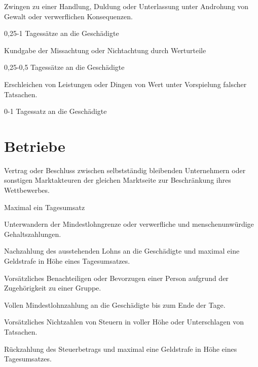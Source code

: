 \documentclass{sasbase}
\begin{document}
\begin{lawparagraph}[Nötigung]
    \item Zwingen zu einer Handlung, Duldung oder Unterlassung unter Androhung von Gewalt oder
        verwerflichen Konsequenzen.
    \item 0,25-1 Tagessätze an die Geschädigte
\end{lawparagraph}

\begin{lawparagraph}[Beleidigung]
    \item Kundgabe der Missachtung oder Nichtachtung durch Werturteile
    \item 0,25-0,5 Tagessätze an die Geschädigte
\end{lawparagraph}

\begin{lawparagraph}
    \item Erschleichen von Leistungen oder Dingen von Wert unter Vorspielung falscher Tatsachen.
    \item 0-1 Tagessatz an die Geschädigte
\end{lawparagraph}

\section{Betriebe}

\begin{lawparagraph}[Kartellbildung]
    \item Vertrag oder Beschluss zwischen selbstständig bleibenden Unternehmern oder sonstigen
        Marktakteuren der gleichen Marktseite zur Beschränkung ihres Wettbewerbes.
    \item Maximal ein Tagesumsatz
\end{lawparagraph}

\begin{lawparagraph}[Lohndumping]
    \item Unterwandern der Mindestlohngrenze oder verwerfliche und menschenunwürdige
        Gehaltszahlungen.
    \item Nachzahlung des ausstehenden Lohns an die Geschädigte und maximal eine Geldstrafe in Höhe
        eines Tagesumsatzes.
\end{lawparagraph}

\begin{lawparagraph}[Diskriminierung]
    \item Vorsätzliches Benachteiligen oder Bevorzugen einer Person aufgrund der Zugehörigkeit
        zu einer Gruppe.
    \item Vollen Mindestlohnzahlung an die Geschädigte bis zum Ende der Tage.
\end{lawparagraph}

\begin{lawparagraph}[Steuerhinterziehung]
    \item Vorsätzliches Nichtzahlen von Steuern in voller Höhe oder Unterschlagen von Tatsachen.
    \item Rückzahlung des Steuerbetrags und maximal eine Geldstrafe in Höhe eines Tagesumsatzes.
\end{lawparagraph}
\end{document}
